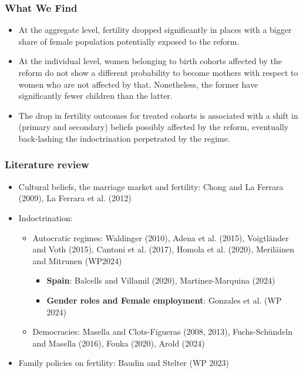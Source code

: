 \documentclass[aspectratio=169]{beamer}
\begin{document}
\begin{frame}
\frametitle{What We Find}
\begin{itemize}
    \item At the aggregate level, fertility dropped significantly in places with a bigger share of female population potentially exposed to the reform.
\medskip
 \item At the individual level,   women belonging to birth cohorts affected by the reform do not show a different probability to become mothers with respect to women who are not affected by that. Nonetheless, the former have significantly fewer children than the latter.
\medskip
    \item The drop in fertility outcomes for treated cohorts is associated with a shift in (primary and secondary) beliefs possibly affected by the reform, eventually back-lashing the indoctrination perpetrated by the regime.

\end{itemize}


\end{frame} 


\begin{frame}
\frametitle{Literature review}
\medskip

\begin{itemize}
\item {\color{blue} Cultural beliefs, the marriage market and fertility:} Chong and La Ferrara (2009), La Ferrara et al. (2012)
    \medskip

\item {\color{blue}Indoctrination}:
\begin{itemize}
    \medskip

    \item {\color{blue} Autocratic regimes}:  Waldinger (2010), Adena et al. (2015), Voigtländer and Voth (2015), Cantoni et al. (2017), Homola et al. (2020), Meriläinen and Mitrunen (WP2024) 
    \begin{itemize}
    \medskip
        \item \textbf{Spain}: Balcells and Villamil (2020), Martinez-Marquina (2024)
         \item \textbf{Gender roles and Female employment}: Gonzales et al. (WP 2024)
    \end{itemize}
    \medskip
   
    \item {\color{blue}Democracies:} Masella and Clots-Figueras (2008, 2013), Fuchs-Schündeln  and Masella (2016), Fouka (2020), Arold (2024)
\end{itemize}

      \medskip   
\item {\color{blue}Family policies on fertility}: 
Baudin and Stelter (WP 2023)
\end{itemize}

\end{frame}
\end{document}

